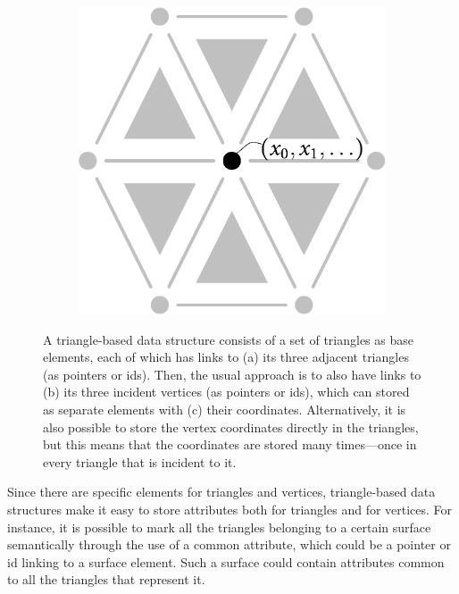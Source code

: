 \begin{figure}
\begin{subfigure}[b]{0.27\linewidth}
\caption{}%
\label{subfig:2-simplex-vertices}
\end{subfigure}
\quad
\begin{subfigure}[b]{0.27\linewidth}
\includegraphics[width=\linewidth]{figs/0-simplex}
\caption{}%
\label{subfig:0-simplex}
\end{subfigure}
\caption{A triangle-based data structure consists of a set of triangles as base elements, each of which has links to (a) its three adjacent triangles (as pointers or ids).
Then, the usual approach is to also have links to (b) its three incident vertices (as pointers or ids), which can stored as separate elements with (c) their coordinates.
Alternatively, it is also possible to store the vertex coordinates directly in the triangles, but this means that the coordinates are stored many times---once in every triangle that is incident to it.}%
\label{fig:2-simplex}
\end{figure}

Since there are specific elements for triangles and vertices, triangle-based data structures make it easy to store attributes both for triangles and for vertices.
For instance, it is possible to mark all the triangles belonging to a certain surface semantically through the use of a common attribute, which could be a pointer or id linking to a surface element.
Such a surface could contain attributes common to all the triangles that represent it.

